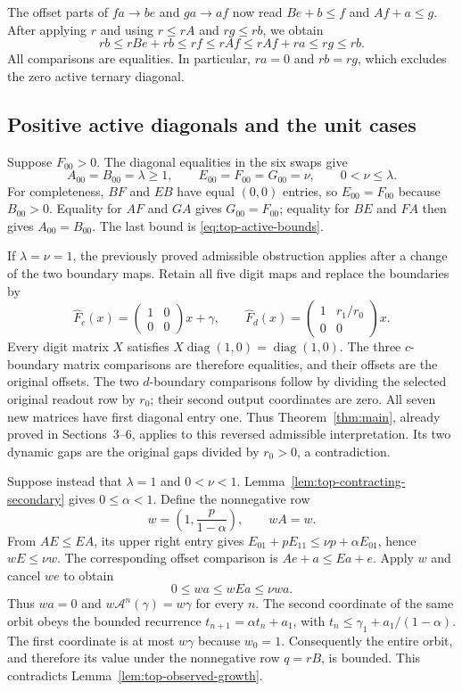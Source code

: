 \documentclass[11pt,a4paper]{article}
\newcommand{\diag}{\operatorname{diag}}
\begin{document}
The offset parts of $fa\to be$ and $ga\to af$ now read
$Be+b\le f$ and $Af+a\le g$. After applying $r$ and using
$r\le rA$ and $rg\le rb$, we obtain
\[
rb\le rBe+rb\le rf\le rAf\le rAf+ra\le rg\le rb.
\]
All comparisons are equalities. In particular, $ra=0$ and $rb=rg$,
which excludes the zero active ternary diagonal.

\subsection{Positive active diagonals and the unit cases}

Suppose $F_{00}>0$. The diagonal equalities in the six swaps give
\begin{equation}\label{eq:top-lambda-nu}
A_{00}=B_{00}=\lambda\ge1,\qquad
E_{00}=F_{00}=G_{00}=\nu,\qquad 0<\nu\le\lambda.
\end{equation}
For completeness, $BF$ and $EB$ have equal $(0,0)$ entries,
so $E_{00}=F_{00}$ because $B_{00}>0$.
Equality for $AF$ and $GA$ gives $G_{00}=F_{00}$; equality
for $BE$ and $FA$ then gives $A_{00}=B_{00}$.
The last bound is \eqref{eq:top-active-bounds}.

If $\lambda=\nu=1$, the previously proved admissible obstruction
applies after a change of the two boundary maps. Retain all five digit
maps and replace the boundaries by
\[
\widehat F_c(x)=\begin{pmatrix}1&0\\0&0\end{pmatrix}x+\gamma,
\qquad
\widehat F_d(x)=
\begin{pmatrix}1&r_1/r_0\\0&0\end{pmatrix}x.
\]
Every digit matrix $X$ satisfies $X\diag(1,0)=\diag(1,0)$.
The three $c$-boundary matrix comparisons are therefore equalities,
and their offsets are the original offsets. The two $d$-boundary
comparisons follow by dividing the selected original readout row by
$r_0$; their second output coordinates are zero. All seven new
matrices have first diagonal entry one. Thus Theorem~\ref{thm:main},
already proved in Sections~3--6, applies to this reversed admissible
interpretation. Its two dynamic gaps are the original gaps divided
by $r_0>0$, a contradiction.

Suppose instead that $\lambda=1$ and $0<\nu<1$.
Lemma~\ref{lem:top-contracting-secondary} gives $0\le\alpha<1$.
Define the nonnegative row
\[
w=\left(1,\frac{p}{1-\alpha}\right),\qquad wA=w.
\]
From $AE\le EA$, its upper right entry gives
$E_{01}+pE_{11}\le\nu p+\alpha E_{01}$, hence
$wE\le\nu w$. The corresponding offset comparison is
$Ae+a\le Ea+e$. Apply $w$ and cancel $we$ to obtain
\[
0\le wa\le wEa\le\nu wa.
\]
Thus $wa=0$ and $w\mathcal A^n(\gamma)=w\gamma$ for every $n$.
The second coordinate of the same orbit obeys the bounded recurrence
$t_{n+1}=\alpha t_n+a_1$, with
$t_n\le\gamma_1+a_1/(1-\alpha)$.
The first coordinate is at most $w\gamma$ because $w_0=1$.
Consequently the entire orbit, and therefore its value under the
nonnegative row $q=rB$, is bounded. This contradicts
Lemma~\ref{lem:top-observed-growth}.
\end{document}

